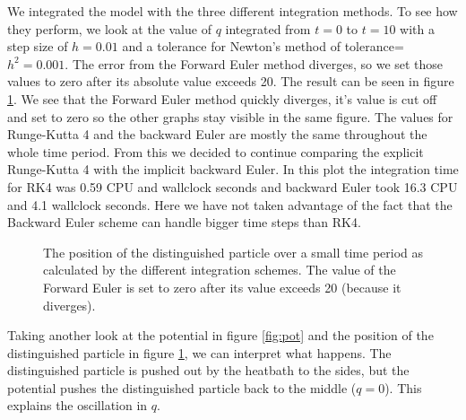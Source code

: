 \documentclass{article}
\begin{document}
We integrated the model with the three different integration methods. To see how they perform, we look at the value of $q$ integrated from $t=0$ to $t=10$ with a step size of $h=0.01$ and a tolerance for Newton's method of tolerance=$h^2 = 0.001$. The error from the Forward Euler method diverges, so we set those values to zero after its absolute value exceeds 20. The result can be seen in figure \ref{fig:compare}. We see that the Forward Euler method quickly diverges, it's value is cut off and set to zero so the other graphs stay visible in the same figure. The values for Runge-Kutta 4 and the backward Euler are mostly the same throughout the whole time period. From this we decided to continue comparing the explicit Runge-Kutta 4 with the implicit backward Euler. In this plot the integration time for RK4 was 0.59 CPU and wallclock seconds and backward Euler took 16.3 CPU and 4.1 wallclock seconds. Here we have not taken advantage of the fact that the Backward Euler scheme can handle bigger time steps than RK4.

\begin{figure}
\caption{The position of the distinguished particle over a small time period as calculated by the different integration schemes. The value of the Forward Euler is set to zero after its value exceeds 20 (because it diverges).}
\label{fig:compare}
\end{figure}

Taking another look at the potential in figure \ref{fig:pot} and the position of the distinguished particle in figure \ref{fig:compare}, we can interpret what happens. The distinguished particle is pushed out by the heatbath to the sides, but the potential pushes the distinguished particle back to the middle ($q=0$). This explains the oscillation in $q$.
\end{document}
